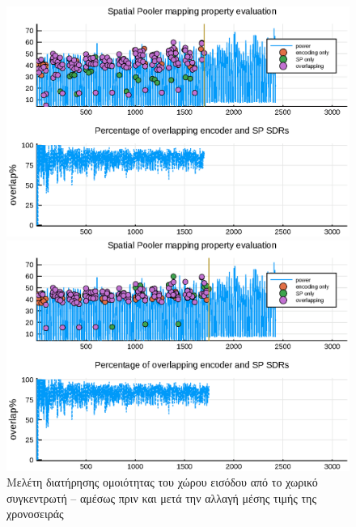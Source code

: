 	\begin{figure}[t]
		\includegraphics[width=1.1\textwidth]{figures/sp1.eps} \par
		\includegraphics[width=1.1\textwidth]{figures/sp2.eps}
		\caption[]{Μελέτη διατήρησης ομοιότητας του χώρου εισόδου από το χωρικό συγκεντρωτή
		-- αμέσως πριν και μετά την αλλαγή μέσης τιμής της χρονοσειράς}
	\end{figure}
